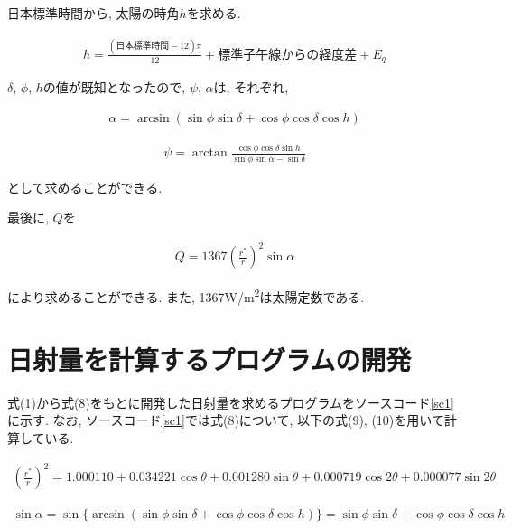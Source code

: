 \documentclass[a4j,12pt,]{jarticle}
\begin{document}
日本標準時間から, 太陽の時角$h$を求める.

\begin{eqnarray}
  h = \frac{(日本標準時間-12)\pi}{12}+標準子午線からの経度差+E_q
\end{eqnarray}

$\delta$, $\phi$, $h$の値が既知となったので, $\psi$, $\alpha$は, それぞれ,

\begin{eqnarray}
  \alpha = \arcsin (\sin \phi\sin \delta+\cos \phi\cos \delta\cos h)
\end{eqnarray}

\begin{eqnarray}
  \psi = \arctan \frac{\cos \phi\cos \delta\sin h}{\sin \phi\sin \alpha-\sin \delta}
\end{eqnarray}

として求めることができる.

最後に, $Q$を

\begin{eqnarray}
  Q = 1367(\frac{r^{*}}{r})^{2}\sin \alpha
\end{eqnarray}

により求めることができる.
また, 1367\si{\watt}/\si{\metre\squared}は太陽定数である.

\section{日射量を計算するプログラムの開発}
式(1)から式(8)をもとに開発した日射量を求めるプログラムをソースコード\ref{sc1}に示す.
なお, ソースコード\ref{sc1}では式(8)について, 以下の式(9), (10)を用いて計算している.

\begin{eqnarray}
  (\frac{r^{*}}{r})^{2} = 1.000110+0.034221\cos \theta+0.001280\sin \theta+0.000719\cos 2\theta+0.000077\sin 2\theta
\end{eqnarray}

\begin{eqnarray}
  \sin \alpha = \sin \{\arcsin (\sin \phi\sin \delta+\cos \phi\cos \delta\cos h)\} = \sin \phi\sin \delta+\cos \phi\cos \delta\cos h
\end{eqnarray}
\end{document}
